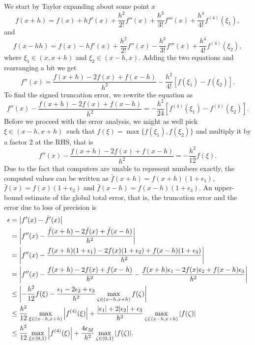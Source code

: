 \documentclass[english,notitlepage]{revtex4-1}  %
\begin{document}
We start by Taylor expanding about some point $x$ 
\begin{equation}
	f(x+h) = f(x) + hf'(x) + \frac{h^2}{2!}f''(x) + \frac{h^3}{3!}f'''(x) + \frac{h^4}{4!}f^{(4)}(\xi_1),
\end{equation}
and 
\begin{equation}
	f(x-hh) = f(x) - hf'(x) + \frac{h^2}{2!}f''(x) - \frac{h^3}{3!}f'''(x) + \frac{h^4}{4!}f^{(4)}(\xi_2),
\end{equation}
where $\xi_1 \in (x,x+h)$ and $\xi_2 \in (x-h,x)$. Adding the two equations and rearranging a bit we get 
\begin{equation}
	f''(x) = \frac{f(x+h)-2f(x) + f(x-h)}{h^2} - \frac{h^2}{4!}\left[f(\xi_1)-f(\xi_2)\right].
\end{equation}
To find the signed truncation error, we rewrite the equation as 
\begin{equation}
	f''(x) - \frac{f(x+h)-2f(x) + f(x-h)}{h^2} = -\frac{h^2}{24}\left[f^{(4)}(\xi_1)-f^{(4)}(\xi_2)\right].
\end{equation}
Before we proceed with the error analysis, we might as well pick $\xi \in (x-h,x+h)$ such that $f(\xi) = \max \{f(\xi_1),f(\xi_2)\}$ and multiply it by a factor $2$ at the RHS, that is
\begin{equation}
	f''(x) - \frac{f(x+h)-2f(x) + f(x-h)}{h^2} = -\frac{h^2}{12}f(\xi).
\end{equation}
Due to the fact that computers are unable to represent numbers exactly, the computed values can be written as $\bar{f}(x+h) = f(x+h)(1+\epsilon_1)$, $\bar{f}(x) = f(x)(1+\epsilon_2)$ and $\bar{f}(x-h) = f(x-h)(1+\epsilon_3)$. An upper-bound estimate of the global total error, that is, the truncation error and the error due to loss of precision is 
\begin{equation}
	\begin{split}
	\epsilon & = \abs{f'(x) - \bar{f}'(x)} \\
			 & = \abs{f''(x) - \frac{\bar{f}(x+h)-2\bar{f}(x) + \bar{f}(x-h)}{h^2}}\\
			 & = \abs{f''(x) - \frac{f(x+h)(1+\epsilon_1)-2f(x)(1+\epsilon_2) + f(x-h)(1+\epsilon_3)}{h^2}} \\
			 & = \abs{f''(x) - \frac{f(x+h)-2f(x) + f(x-h)}{h^2} - \frac{f(x+h)\epsilon_1 - 2f(x)\epsilon_2 + f(x-h)\epsilon_3}{h^2}} \\
			 & \leq \abs{-\frac{h^2}{12}f(\xi)- \frac{\epsilon_1 - 2\epsilon_2 + \epsilon_3}{h^2}\max_{\zeta \in (x-h,x+h)}f(\zeta)} \\
			 & \leq 
			 \frac{h^2}{12}\max_{\xi \in (x-h,x+h)}\abs{f^{(4)}(\xi)} + \frac{\abs{\epsilon_1} + 2\abs{\epsilon_2} + \epsilon_3}{h^2}\max_{\zeta \in (x-h,x+h)}\abs{f(\zeta)} \\
			 & \leq \frac{h^2}{12}\max_{\xi \in (0,1)}\abs{f^{(4)}(\xi)} + \frac{4\epsilon_M}{h^2}\max_{\zeta \in (0,1)}\abs{f(\zeta)}.
	\end{split}
\end{equation}
\end{document}
